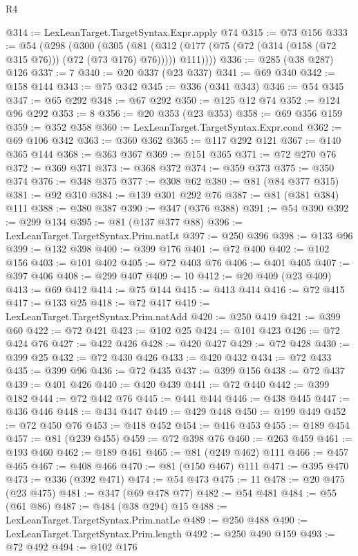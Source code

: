 \begin{lexlean}{R4}
\begin{coremodule}
{{{{{{{{{{{{{{{{{{{{{{{{{{{{{@314 := LexLeanTarget.TargetSyntax.Expr.apply @74
@315 := @73 @156
@333 := @54
    (@298
      (@300
        (@305
          (@81 (@312 (@177 (@75 (@72 (@314 (@158 (@72 @315 @76))) (@72 (@73 @176) @76))))) @111))))
@336 := @285 (@38 @287) @126
@337 := 7
@340 := @20 @337 (@23 @337)
@341 := @69 @340
@342 := @158 @144
@343 := @75 @342
@345 := @336 (@341 @343)
@346 := @54 @345
@347 := @65 @292
@348 := @67 @292
@350 := @125 @12 @74
@352 := @124 @96 @292
@353 := 8
@356 := @20 @353 (@23 @353)
@358 := @69 @356 @159
@359 := @352 @358
@360 := LexLeanTarget.TargetSyntax.Expr.cond
@362 := @69 @106 @342
@363 := @360 @362
@365 := @117 @292 @121
@367 := @140 @365 @144
@368 := @363 @367
@369 := @151 @365
@371 := @72 @270 @76
@372 := @369 @371
@373 := @368 @372
@374 := @359 @373
@375 := @350 @374
@376 := @348 @375
@377 := @308 @62
@380 := @81 (@84 @377 @315)
@381 := @92 @310
@384 := @139 @301 @292 @76
@387 := @81 (@381 @384) @111
@388 := @380 @387
@390 := @347 (@376 @388)
@391 := @54 @390
@392 := @299 @134
@395 := @81 (@137 @377 @88)
@396 := LexLeanTarget.TargetSyntax.Prim.natLt
@397 := @250 @396
@398 := @133 @96
@399 := @132 @398
@400 := @399 @176
@401 := @72 @400
@402 := @102 @156
@403 := @101 @402
@405 := @72 @403 @76
@406 := @401 @405
@407 := @397 @406
@408 := @299 @407
@409 := 10
@412 := @20 @409 (@23 @409)
@413 := @69 @412
@414 := @75 @144
@415 := @413 @414
@416 := @72 @415
@417 := @133 @25
@418 := @72 @417
@419 := LexLeanTarget.TargetSyntax.Prim.natAdd
@420 := @250 @419
@421 := @399 @60
@422 := @72 @421
@423 := @102 @25
@424 := @101 @423
@426 := @72 @424 @76
@427 := @422 @426
@428 := @420 @427
@429 := @72 @428
@430 := @399 @25
@432 := @72 @430 @426
@433 := @420 @432
@434 := @72 @433
@435 := @399 @96
@436 := @72 @435
@437 := @399 @156
@438 := @72 @437
@439 := @401 @426
@440 := @420 @439
@441 := @72 @440
@442 := @399 @182
@444 := @72 @442 @76
@445 := @441 @444
@446 := @438 @445
@447 := @436 @446
@448 := @434 @447
@449 := @429 @448
@450 := @199 @449
@452 := @72 @450 @76
@453 := @418 @452
@454 := @416 @453
@455 := @189 @454
@457 := @81 (@239 @455)
@459 := @72 @398 @76
@460 := @263 @459
@461 := @193 @460
@462 := @189 @461
@465 := @81 (@249 @462) @111
@466 := @457 @465
@467 := @408 @466
@470 := @81 (@150 @467) @111
@471 := @395 @470
@473 := @336 (@392 @471)
@474 := @54 @473
@475 := 11
@478 := @20 @475 (@23 @475)
@481 := @347 (@69 @478 @77)
@482 := @54 @481
@484 := @55 (@61 @86)
@487 := @484 (@38 @294) @15
@488 := LexLeanTarget.TargetSyntax.Prim.natLe
@489 := @250 @488
@490 := LexLeanTarget.TargetSyntax.Prim.length
@492 := @250 @490 @159
@493 := @72 @492
@494 := @102 @176
}}}}}}}}}}}}}}}}}}}}}}}}}}}}}
\end{coremodule}
\end{lexlean}
